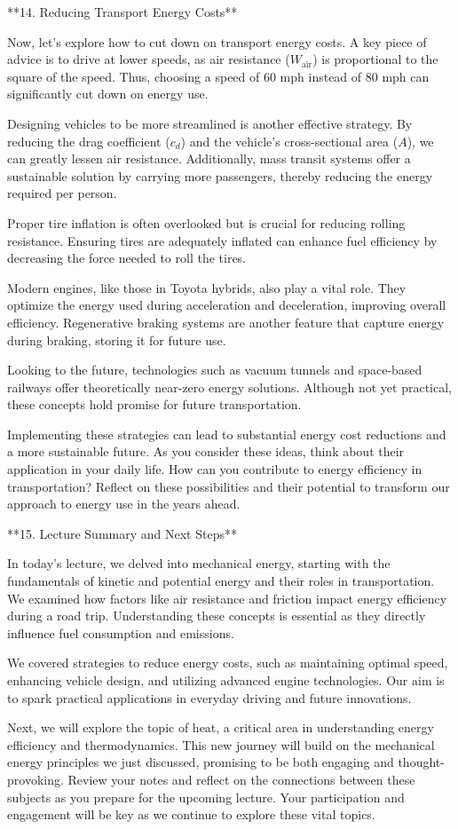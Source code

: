 \begin{tcolorbox}[size=title,opacityfill=0.05,breakable]
**14. Reducing Transport Energy Costs**

Now, let's explore how to cut down on transport energy costs. A key piece of advice is to drive at lower speeds, as air resistance (\( W_{\text{air}} \)) is proportional to the square of the speed. Thus, choosing a speed of 60 mph instead of 80 mph can significantly cut down on energy use.

Designing vehicles to be more streamlined is another effective strategy. By reducing the drag coefficient (\( c_d \)) and the vehicle's cross-sectional area (\( A \)), we can greatly lessen air resistance. Additionally, mass transit systems offer a sustainable solution by carrying more passengers, thereby reducing the energy required per person.

Proper tire inflation is often overlooked but is crucial for reducing rolling resistance. Ensuring tires are adequately inflated can enhance fuel efficiency by decreasing the force needed to roll the tires.

Modern engines, like those in Toyota hybrids, also play a vital role. They optimize the energy used during acceleration and deceleration, improving overall efficiency. Regenerative braking systems are another feature that capture energy during braking, storing it for future use.

Looking to the future, technologies such as vacuum tunnels and space-based railways offer theoretically near-zero energy solutions. Although not yet practical, these concepts hold promise for future transportation.

Implementing these strategies can lead to substantial energy cost reductions and a more sustainable future. As you consider these ideas, think about their application in your daily life. How can you contribute to energy efficiency in transportation? Reflect on these possibilities and their potential to transform our approach to energy use in the years ahead.

**15. Lecture Summary and Next Steps**

In today's lecture, we delved into mechanical energy, starting with the fundamentals of kinetic and potential energy and their roles in transportation. We examined how factors like air resistance and friction impact energy efficiency during a road trip. Understanding these concepts is essential as they directly influence fuel consumption and emissions.

We covered strategies to reduce energy costs, such as maintaining optimal speed, enhancing vehicle design, and utilizing advanced engine technologies. Our aim is to spark practical applications in everyday driving and future innovations.

Next, we will explore the topic of heat, a critical area in understanding energy efficiency and thermodynamics. This new journey will build on the mechanical energy principles we just discussed, promising to be both engaging and thought-provoking. Review your notes and reflect on the connections between these subjects as you prepare for the upcoming lecture. Your participation and engagement will be key as we continue to explore these vital topics.


\end{tcolorbox}
